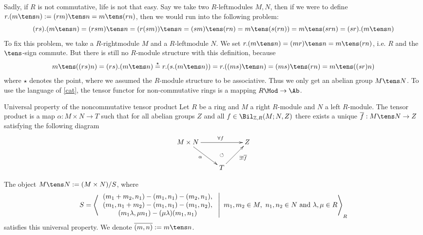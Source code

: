 \documentclass[twoside = false,	%
		headsepline,		%
		parskip = true,
		]{scrbook}						%
\begin{document}
    Sadly, if $R$ is not commutative, life is not that easy. Say we take two $R$-leftmodules $M,N$, then if we were to define $r.(m \tens n) := (rm) \tens n = m \tens (rn)$, then we would run into the following problem:
    \begin{equation*}
        (rs).(m \tens n) = (rsm) \tens n = (r(sm)) \tens n = (sm) \tens (rn) = m \tens (s(rn)) = m \tens (srn) = (sr).(m \tens n) 
    \end{equation*}
    To fix this problem, we take a $R$-rightmodule $M$ and a $R$-leftmodule $N$. We set $r.(m \tens n) = (mr) \tens n = m \tens (rn)$, i.e. $R$ and the $\tens$-sign commute. But there is still no $R$-module structure with this definition, because
    \begin{equation*}
        m \tens ((rs)n) = (rs).(m \tens n) \overset{\star}{=} r.(s.(m \tens n)) = r.((ms) \tens n) = (ms) \tens (rn) = m \tens ((sr)n)
    \end{equation*}
    where $\star$ denotes the point, where we assumed the $R$-module structure to be associative. Thus we only get an abelian group $M \tens N$. To use the language of \ref{cat}, the tensor functor for non-commutative rings is a mapping $R\Mod \to \Ab$.

    \begin{definition*}{Universal property of the noncommutative tensor product}{}
        Let $R$ be a ring and $M$ a right $R$-module and $N$ a left $R$-module. The tensor product is a map $\alpha: M \times N \to T$ such that for all abelian groups $Z$ and all $f \in \Bil_{\Z,R}(M;N,Z)$ there exists a unique $\overline{f}: M \tens N \to Z$ satisfying the following diagram
        \begin{equation*}
        \xymatrix {
            M \times N \ar[rr]^(.55){\forall f} \ar[dr]_(.45){\alpha}& & Z \\
            & T \ar@{}[u]|{\circlearrowleft}\ar[ur]_(.6){\exists ! \overline{f}}
        }
        \end{equation*}
    \end{definition*}
     The object $M \tens N :=(M \times N)/S$, where
        \begin{equation*}
            \begin{split}
                S = \left\langle  \left. \begin{array}{c}
                    (m_1+m_2,n_1) - (m_1,n_1) - (m_2,n_1), \\ (m_1,n_1 + m_2) - (m_1,n_1) - (m_1,n_2),  \\
                    (m_1 \lambda , \mu n_1) -   (\mu \lambda)(m_1, n_1) 
                \end{array}  \ \right| \ m_1,m_2 \in M, \ n_1,n_2 \in N \text{ and } \lambda,\mu \in R \right\rangle_R        
            \end{split}
        \end{equation*}
    satisfies this universal property. We denote $\overline{(m,n)}:= m \tens n$.
    
\end{document}
